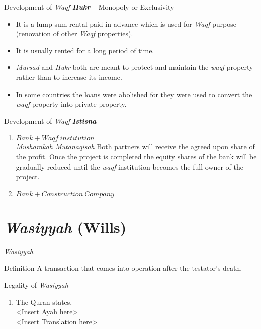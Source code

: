 \begin{frame}{Development of \textit{Waqf}}
\textbf{\textit{Hukr}} – Monopoly or Exclusivity\\
\begin{itemize}
  \item It is a lump sum rental paid in advance which is used for \textit{Waqf} purpose (renovation of other \textit{Waqf} properties).
  \item It is usually rented for a long period of time.
  \item \textit{Mursad} and \textit{Hukr} both are meant to protect and maintain the \textit{waqf} property rather than to increase its income.
  \item In some countries the loans were abolished for they were used to convert the \textit{waqf} property into private property.
\end{itemize}
\end{frame}

\begin{frame}{Development of \textit{Waqf}}
\textbf{\textit{Istisnā}}
\begin{enumerate}
\item $Bank + \textit{Waqf}\  institution$\\
\alert{\textit{Mushārakah Mutanāqisah}} Both partners will receive the agreed upon share of the profit. Once the project is completed the equity shares of the bank will be gradually reduced until the \textit{waqf} institution becomes the full owner of the project.
\item $Bank + Construction \ Company$
\end{enumerate}
\end{frame}

\section{\textit{Wasiyyah} (Wills)}

\begin{frame}{\textit{Wasiyyah}}
\begin{block}{Definition}
A transaction that comes into operation after the testator's death.
\end{block}
\end{frame}

\begin{frame}{Legality of \textit{Wasiyyah}}
\begin{enumerate}
\item The Quran states,\\
<Insert Ayah here>\\
<Insert Translation here>
\end{enumerate}
\end{frame}

